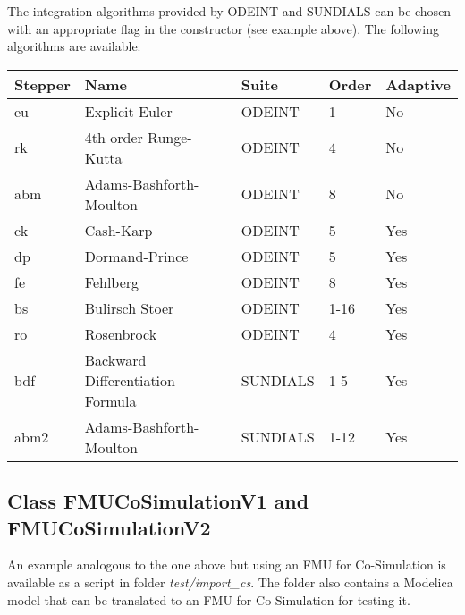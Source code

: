 The integration algorithms provided by ODEINT and SUNDIALS can be chosen with an appropriate flag in the constructor (see example above).
The following algorithms are available:

\begin{center}

\begin{tabular}{|l|l|l|l|l|}
\hline 
Stepper & Name & Suite & Order & Adaptive \\ 
\hline 
eu & Explicit Euler & ODEINT & 1 & No  \\ 
\hline 
rk & 4th order Runge-Kutta & ODEINT & 4 & No  \\ 
\hline 
abm & Adams-Bashforth-Moulton & ODEINT & 8 & No  \\ 
\hline 
ck & Cash-Karp & ODEINT & 5 & Yes  \\ 
\hline 
dp & Dormand-Prince & ODEINT & 5 & Yes  \\ 
\hline 
fe & Fehlberg & ODEINT & 8 & Yes  \\ 
\hline 
bs & Bulirsch Stoer & ODEINT & 1-16 & Yes  \\ 
\hline 
ro & Rosenbrock & ODEINT & 4 & Yes  \\ 
\hline 
bdf & Backward Differentiation Formula & SUNDIALS & 1-5 & Yes  \\ 
\hline 
abm2 & Adams-Bashforth-Moulton & SUNDIALS & 1-12 & Yes \\ 
\hline 
\end{tabular} 

\end{center}


\subsection{Class FMUCoSimulationV1 and FMUCoSimulationV2}

An example analogous to the one above but using an FMU for Co-Simulation is available as a \matlab script in folder \emph{test/import\_cs}.
The folder also contains a Modelica model that can be translated to an FMU for Co-Simulation for testing it.



